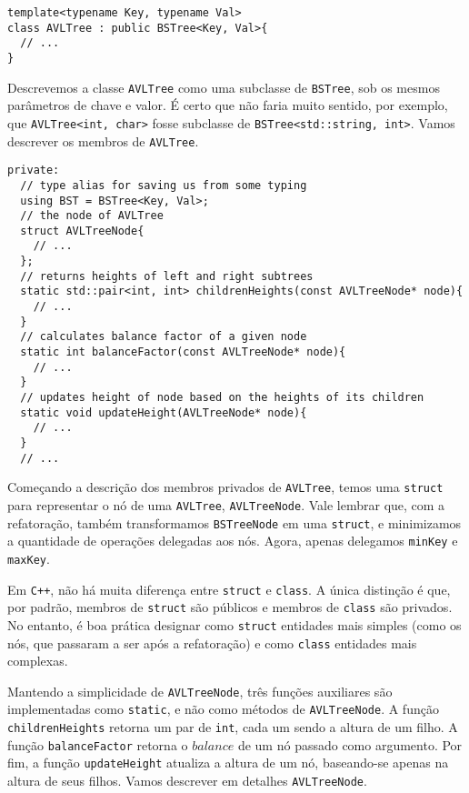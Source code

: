 \documentclass[11pt]{article}
\begin{document}
\begin{verbatim}
template<typename Key, typename Val>
class AVLTree : public BSTree<Key, Val>{
  // ...
}
\end{verbatim}

Descrevemos a classe \texttt{AVLTree} como uma subclasse de \texttt{BSTree}, sob
os mesmos parâmetros de chave e valor.  É certo que não faria
muito sentido, por exemplo, que \texttt{AVLTree<int, char>} fosse
subclasse de \texttt{BSTree<std::string, int>}.  Vamos descrever os
membros de \texttt{AVLTree}.

\pagebreak

\begin{verbatim}
private:
  // type alias for saving us from some typing
  using BST = BSTree<Key, Val>;
  // the node of AVLTree
  struct AVLTreeNode{
    // ...
  };
  // returns heights of left and right subtrees
  static std::pair<int, int> childrenHeights(const AVLTreeNode* node){
    // ...
  }
  // calculates balance factor of a given node
  static int balanceFactor(const AVLTreeNode* node){
    // ...
  }
  // updates height of node based on the heights of its children
  static void updateHeight(AVLTreeNode* node){
    // ...
  }
  // ...
\end{verbatim}

Começando a descrição dos membros privados de \texttt{AVLTree}, temos uma
\texttt{struct} para representar o nó de uma \texttt{AVLTree}, \texttt{AVLTreeNode}.
Vale lembrar que, com a refatoração, também transformamos
\texttt{BSTreeNode} em uma \texttt{struct}, e minimizamos a quantidade de
operações delegadas aos nós.  Agora, apenas delegamos \texttt{minKey} e
\texttt{maxKey}.

Em \texttt{C++}, não há muita diferença entre \texttt{struct} e \texttt{class}. A única
distinção é que, por padrão, membros de \texttt{struct} são públicos e
membros de \texttt{class} são privados.  No entanto, é boa prática
designar como \texttt{struct} entidades mais simples (como os nós, que
passaram a ser após a refatoração) e como \texttt{class} entidades mais
complexas.

Mantendo a simplicidade de \texttt{AVLTreeNode}, três funções auxiliares
são implementadas como \texttt{static}, e não como métodos de
\texttt{AVLTreeNode}.  A função \texttt{childrenHeights} retorna um par de
\texttt{int}, cada um sendo a altura de um filho.  A função
\texttt{balanceFactor} retorna o \(balance\) de um nó passado como
argumento.  Por fim, a função \texttt{updateHeight} atualiza a altura de
um nó, baseando-se apenas na altura de seus filhos.  Vamos
descrever em detalhes \texttt{AVLTreeNode}.
\end{document}
